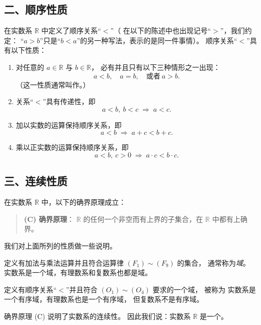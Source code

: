 \documentclass[12pt,a4paper,oneside,utf8]{ctexbook}
\begin{document}
\subsection*{二、顺序性质}

在实数系 $\mathbb{R}$ 中定义了顺序关系“$<$”（
在以下的陈述中也出现记号“$>$”，我们约定：
“$a>b$”只是“$b<a$”的另一种写法，表示的是同一件事情）。
顺序关系“$<$”具有以下性质：

\medskip
\begin{enumerate}[label=($O_{\arabic*})$]
  \item 对任意的 $a\in\mathbb{R}$ 与 $b\in\mathbb{R}$，
  必有并且只有以下三种情形之一出现：
  \[
    a<b,\quad a=b,\quad \text{或者}\ a>b.
  \]
  （这一性质通常叫作。）

  \item 关系“$<$”具有传递性，即
  \[
    a<b,\ b<c \;\Rightarrow\; a<c.
  \]

  \item 加以实数的运算保持顺序关系，即
  \[
    a<b \;\Rightarrow\; a+c<b+c.
  \]

  \item 乘以正实数的运算保持顺序关系，即
  \[
    a<b,\ c>0 \;\Rightarrow\; a\cdot c<b\cdot c.
  \]
\end{enumerate}

\subsection*{三、连续性质}

在实数系 $\mathbb{R}$ 中，以下的确界原理成立：

\begin{quote}
\textbf{(C) 确界原理}：
$\mathbb{R}$ 的任何一个非空而有上界的子集合，在 $\mathbb{R}$ 中都有上确界。
\end{quote}

我们对上面所列的性质做一些说明。

定义有加法与乘法运算并且符合运算律 $(F_1)\sim(F_9)$ 的集合，
通常称为\emph{域}。
实数系是一个域，有理数系和复数系也都是域。

定义有顺序关系“$<$”并且符合 \((O_1)\sim(O_4)\) 要求的一个域，
被称为%
实数系是一个有序域，有理数系也是一个有序域，
但复数系不是有序域。

确界原理 (C) 说明了实数系的连续性。
因此我们说：实数系 $\mathbb{R}$ 是一个。



\ifx\allfiles\undefined %
\end{document}
